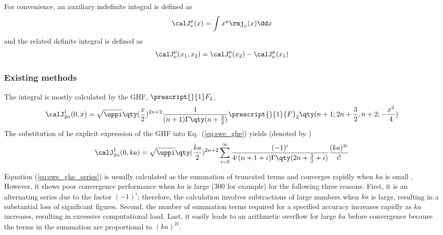 For convenience, an auxiliary indefinite integral is defined as
\begin{equation}
    \calJ_\nu^\mu (x) = \int x^\mu 
    \rmj_{\nu} (x)  \dd x
    \label{eq:230wefsdfpp}
\end{equation}
and the related definite integral is defined as
\begin{equation}
    \calJ_\nu^\mu(x_1,x_2) = \calJ_\nu^\mu (x_2) - \calJ_\nu^\mu(x_1)
\end{equation}

\subsubsection{Existing methods}
\label{sec:cwe_source_radial_existing}
The integral is mostly calculated by the GHF, $\prescript{}{1}F_2$, \cite{Mast2005SimplifiedExpansionsRadiation, Poletti2018SphericalExpansionsSound}
\begin{equation}
    \calJ_{2n}^1 (0,x) 
    =
    \sqrt{\uppi} \qty(\frac{x}{2})^{2n+2}
    \frac{1}{(n+1)\Gamma\qty(n+\frac{3}{2})} 
    \prescript{}{1}{F}_{2} 
    \qty(n+1 ; 2n+\frac{3}{2}, n+2; -\frac{x^2}{4})
    \label{eq:swe_ghe}
\end{equation}
The substitution of he explicit expression of the GHF into Eq.~(\ref{eq:swe_ghe}) yields (denoted by )
\begin{equation}
    \calJ_{2n}^1 (0,ka)
    =
    \sqrt{\uppi} \qty(\frac{ka}{2})^{2n+2}
    \sum_{i=0}^\infty
    \frac{(-1)^i}{ 4^i (n+1+i)\Gamma\qty(2n+\frac{3}{2} + i)} \frac{(ka)^{2i}}{i!}
    \label{eq:swe_ghe_series}
\end{equation}

Equation (\ref{eq:swe_ghe_series}) is usually calculated as the summation of truncated terms and converges rapidly when $ka$ is small \cite{Carley2006SeriesExpansionSound}. 
However, it shows poor convergence performance when $ka$ is large (300 for example) for the following three reasons. 
First, it is an alternating series due to the factor $(-1)^i$; 
therefore, the calculation involves subtractions of large numbers when $ka$ is large, resulting in a substantial loss of significant figures. 
Second, the number of summation terms required for a specified accuracy increases rapidly as $ka$ increases, 
resulting in excessive computational load. 
Last, it easily leads to an arithmetic overflow for large $ka$ before convergence because the terms in the summation are proportional to $(ka)^{2i}$. 


